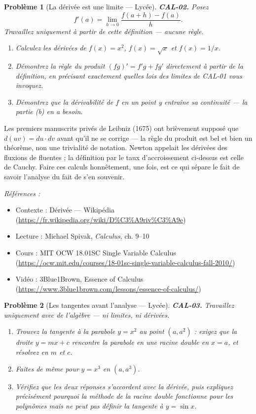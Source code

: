 \documentclass[11pt]{article}
\newtheorem{problem}{Problème}
\newenvironment{refs}{\par\small\noindent\emph{Références :}\begin{itemize}\setlength\itemsep{0pt}}{\end{itemize}\normalsize}
\begin{document}
\bigskip

\begin{problem}[{La dérivée est une limite --- Lycée}]
\textbf{CAL-02.} Posez
\[ f'(a) = \lim_{h\to 0} \frac{f(a+h)-f(a)}{h}. \]
Travaillez uniquement à partir de cette définition --- aucune règle.
\begin{enumerate}
\item[(a)] Calculez les dérivées de $ f(x)=x^2 $, $ f(x)=\sqrt{x} $ et
$ f(x)=1/x $.
\item[(b)] Démontrez la règle du produit $ (fg)' = f'g + fg' $ directement à partir de la définition, en précisant
exactement quelles lois des limites de CAL-01 vous invoquez.
\item[(c)] Démontrez que la dérivabilité de $ f $ en un point y entraîne sa continuité ---
la partie (b) en a besoin.
\end{enumerate}

\end{problem}

\noindent Les premiers manuscrits privés de Leibniz (1675) ont brièvement supposé que
$ d(uv) = du \cdot dv $ avant qu'il ne se corrige --- la règle du produit est bel et bien un
théorème, non une trivialité de notation. Newton appelait les dérivées des \og{} fluxions \fg{} de
\og{} fluentes \fg{} ; la définition par le taux d'accroissement ci-dessus est celle de Cauchy. Faire
ces calculs honnêtement, une fois, est ce qui sépare le fait de savoir l'analyse du fait de s'en souvenir.

\begin{refs}
\item Contexte : Dérivée --- Wikipédia (\url{https://fr.wikipedia.org/wiki/D%C3%A9riv%C3%A9e})
\item Lecture : Michael Spivak, \textit{Calculus}, ch. 9--10
\item Cours : MIT OCW 18.01SC Single Variable Calculus (\url{https://ocw.mit.edu/courses/18-01sc-single-variable-calculus-fall-2010/})
\item Vidéo : 3Blue1Brown, Essence of Calculus (\url{https://www.3blue1brown.com/lessons/essence-of-calculus/})
\end{refs}

\bigskip

\begin{problem}[{Les tangentes avant l'analyse --- Lycée}]
\textbf{CAL-03.} Travaillez uniquement avec de l'algèbre --- ni limites, ni dérivées.
\begin{enumerate}
\item[(a)] Trouvez la tangente à la parabole $ y=x^2 $ au point $ (a, a^2) $ : exigez
que la droite $ y = mx + c $ rencontre la parabole en une racine double en $ x=a $, et résolvez
en $ m $ et $ c $.
\item[(b)] Faites de même pour $ y=x^3 $ en $ (a, a^3) $.
\item[(c)] Vérifiez que les deux réponses s'accordent avec la dérivée, puis expliquez précisément pourquoi
la méthode de la racine double fonctionne pour les polynômes mais ne peut pas définir la tangente à
$ y=\sin x $.
\end{enumerate}

\end{problem}
\end{document}
